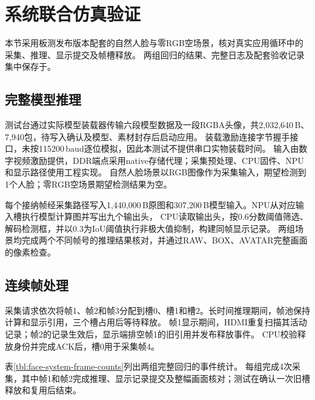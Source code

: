 \section{系统联合仿真验证}\label{sec:box-system-validation}

本节采用板测发布版本配套的自然人脸与零RGB空场景，核对真实应用循环中的采集、推理、显示提交及帧槽释放。
两组回归的结果、完整日志及配套验收记录集中保存于。

\subsection{完整模型推理}

测试台通过实际模型装载器传输六段模型数据及一段RGBA头像，共2,032,640\,B、7,940包，待写入确认及模型、素材封存后启动应用。
装载激励连接字节握手接口，未按115200\,baud逐位模拟，因此本测试不提供串口实物装载时间。
输入由数字视频激励提供，DDR端点采用native存储代理；采集预处理、CPU固件、NPU和显示路径使用工程实现。
自然人脸场景以RGB图像作为采集输入，期望检测到1个人脸；零RGB空场景期望检测结果为空。

每个接纳帧经采集路径写入1,440,000\,B原图和307,200\,B模型输入。NPU从对应输入槽执行模型计算图并写出九个输出头，
CPU读取输出头，按0.6分数阈值筛选、解码检测框，并以0.3为IoU阈值执行非极大值抑制，构建同帧显示记录。
两组场景均完成两个不同帧号的推理结果核对，并通过RAW、BOX、AVATAR完整画面的像素检查。

\subsection{连续帧处理}

采集请求依次将帧1、帧2和帧3分配到槽0、槽1和槽2。长时间推理期间，帧池保持计算和显示引用，三个槽占用后等待释放。
帧1显示期间，HDMI重复扫描其活动记录；帧2的记录生效后，显示端排空帧1的旧引用并发布释放事件。
CPU校验释放身份并完成ACK后，槽0用于采集帧4。

表\ref{tbl:face-system-frame-counts}列出两组完整回归的事件统计。
每组完成4次采集，其中帧1和帧2完成推理、显示记录提交及整幅画面核对；测试在确认一次旧槽释放和复用后结束。

